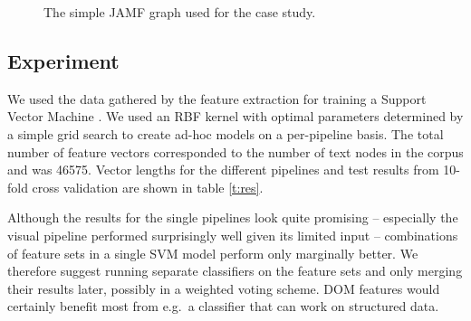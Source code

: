 \begin{figure}[h]
\centering
{}
\caption{
\label{f:jamfgraph}
	The simple JAMF graph used for the case study.}
\end{figure}

\subsection{Experiment}

We used the data gathered by the feature extraction for training a Support Vector Machine \cite{libsvm}.
We used an RBF kernel with optimal parameters determined by a simple grid search to create ad-hoc models on a per-pipeline basis.
The total number of feature vectors corresponded to the number of text nodes in the corpus and was 46575.
Vector lengths for the different pipelines and test results from 10-fold cross validation are shown in table \ref{t:res}.

Although the results for the single pipelines look quite promising -- especially the visual pipeline performed surprisingly well given its limited input -- combinations of feature sets in a single SVM model perform only marginally better.
We therefore suggest running separate classifiers on the feature sets and only merging their results later, possibly in a weighted voting scheme.
DOM features would certainly benefit most from e.g.~a classifier that can work on structured data.

